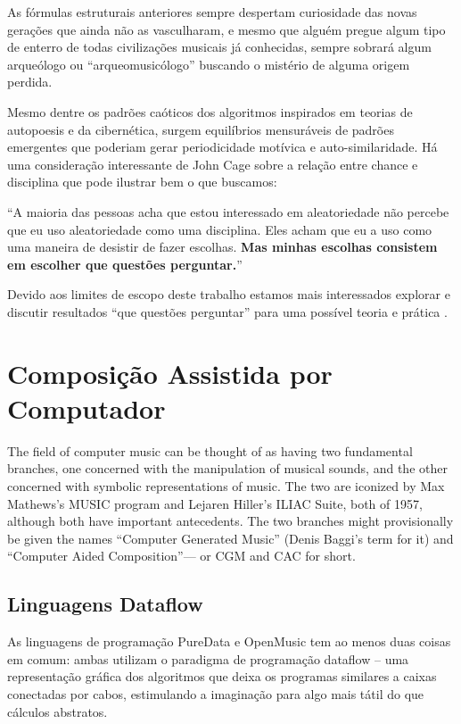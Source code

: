 \documentclass[
	12pt,				%
	openright,			%
	twoside,			%
	a4paper,			%
	english,			%
	french,				%
	spanish,			%
	brazil				%
	]{abntex2}
\begin{document}
As fórmulas estruturais anteriores sempre despertam curiosidade das novas gerações que ainda não as vasculharam, e mesmo que alguém pregue algum tipo de enterro de todas civilizações musicais já conhecidas, sempre sobrará algum arqueólogo ou “arqueomusicólogo” buscando o mistério de alguma origem perdida.

Mesmo dentre os padrões caóticos dos algoritmos inspirados em teorias de autopoesis e da cibernética, surgem equilíbrios mensuráveis de padrões emergentes que poderiam gerar periodicidade motívica e auto-similaridade. Há uma consideração interessante de John Cage sobre a relação entre chance e disciplina que pode ilustrar bem o que buscamos:

\begin{citacao}
“A maioria das pessoas acha que estou interessado em aleatoriedade não percebe que eu uso aleatoriedade como uma disciplina. Eles acham que eu a uso como uma maneira de desistir de fazer escolhas. 
\textbf{Mas minhas escolhas consistem em escolher que questões perguntar.}” \cite[ p.17, grifos nosso]{cagekostelanetz2002conversing}
\end{citacao}

Devido aos limites de escopo deste trabalho estamos mais interessados explorar e discutir  resultados “que questões perguntar” para uma possível teoria e prática .  

\chapter{Composição Assistida por Computador}


The field of computer music can be thought of as having two fundamental branches, one concerned with the manipulation of musical sounds, and the other concerned with symbolic representations of music. The two are iconized by Max Mathews’s MUSIC program and Lejaren Hiller’s ILIAC Suite, both of 1957, although both have important antecedents. The two branches might provisionally be given the names “Computer Generated Music” (Denis Baggi’s term for it) and “Computer Aided Composition”— or CGM and CAC for short. 
\cite[pg. ]{puckettecomputing}





\section{Linguagens Dataflow}
\label{ferramentas}

As linguagens de programação PureData e OpenMusic tem ao menos duas coisas em comum: ambas utilizam o paradigma de programação dataflow – uma representação gráfica dos algoritmos que deixa os programas similares a caixas conectadas por cabos, estimulando a imaginação para algo mais tátil do que cálculos abstratos.
\end{document}
